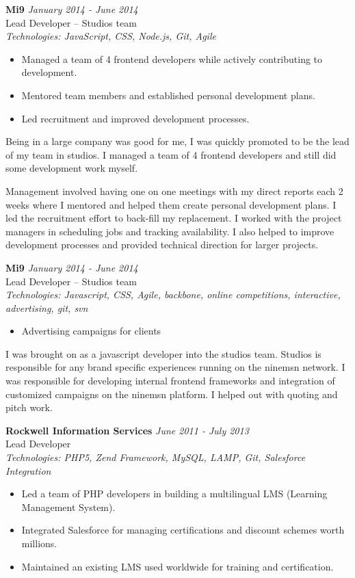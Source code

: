 \documentclass[a4paper,10pt]{article}
\begin{document}
\vspace{1em}

\textbf{Mi9} \hfill \textit{January 2014 - June 2014} \\
Lead Developer – Studios team \\
\textit{Technologies: JavaScript, CSS, Node.js, Git, Agile}
\begin{itemize}
    \item Managed a team of 4 frontend developers while actively contributing to development.
    \item Mentored team members and established personal development plans.
    \item Led recruitment and improved development processes.
\end{itemize}

Being in a large company was good for me, I was quickly promoted to be the lead of my team in studios. I managed a 
team of 4 frontend developers and still did some development work myself.

Management involved having one on one meetings with my direct reports each 2 weeks where I mentored and helped 
them create personal development plans. I led the recruitment effort to back-fill my replacement. I worked with the 
project managers in scheduling jobs and tracking availability. I also helped to improve development processes and 
provided technical direction for larger projects.

\vspace{1em}

\textbf{Mi9} \hfill \textit{January 2014 - June 2014} \\
Lead Developer – Studios team \\
\textit{Technologies: Javascript, CSS, Agile, backbone, online competitions, interactive, advertising, git, svn}
\begin{itemize}
    \item Advertising campaigns for clients
\end{itemize}

I was brought on as a javascript developer into the studios team. Studios is responsible for any brand specific 
experiences running on the ninemsn network. I was responsible for developing internal frontend frameworks and 
integration of customized campaigns on the ninemsn platform. I helped out with quoting and pitch work.

\vspace{1em}

\textbf{Rockwell Information Services} \hfill \textit{June 2011 - July 2013} \\
Lead Developer \\
\textit{Technologies: PHP5, Zend Framework, MySQL, LAMP, Git, Salesforce Integration}
\begin{itemize}
    \item Led a team of PHP developers in building a multilingual LMS (Learning Management System).
    \item Integrated Salesforce for managing certifications and discount schemes worth millions.
    \item Maintained an existing LMS used worldwide for training and certification.
\end{itemize}
\end{document}
